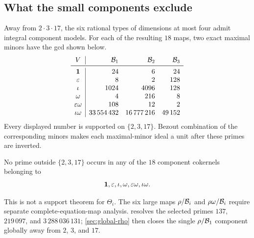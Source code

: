 \subsection{What the small components exclude}

Away from \(2\cdot3\cdot17\), the six rational types of dimensions at
most four admit integral component models.  For each of the resulting
\(18\) maps, two exact maximal minors have the gcd shown below.
\[
\begin{array}{c|rrr}
V&\cB_1&\cB_2&\cB_3\\
\midrule
\mathbf1&24&6&24\\
\eps&8&2&128\\
\iot&1024&4096&128\\
\om&4&216&8\\
\eps\om&108&12&2\\
\iot\om&33\,554\,432&16\,777\,216&49\,152
\end{array}
\]
Every displayed number is supported on \(\{2,3,17\}\).  Bezout
combination of the corresponding minors makes each maximal-minor ideal a
unit after these primes are inverted.

\begin{proposition}
\label{prop:small-components}
No prime outside \(\{2,3,17\}\) occurs in any of the \(18\) component
cokernels belonging to
\[
\mathbf1,\varepsilon,\iota,\omega,\varepsilon\omega,\iota\omega.
\]
\end{proposition}

This is not a support theorem for \(\Theta_i\).  The six large maps
\(\rho/\mathcal B_i\) and \(\rho\omega/\mathcal B_i\) require separate complete-equation-map
analysis.   resolves the selected primes
\(137\), \(219\,097\), and
\(3\,288\,036\,131\); \cref{sec:global-rho} then closes the single
\(\rho/\mathcal B_1\) component globally away from \(2\), \(3\), and \(17\).
